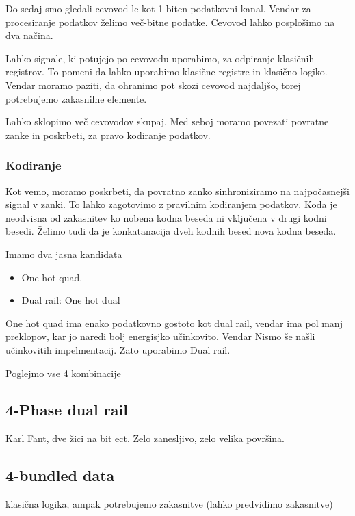 Do sedaj smo gledali cevovod le kot 1 biten podatkovni kanal. Vendar za procesiranje podatkov želimo več-bitne podatke. Cevovod lahko posplošimo na dva načina. 

Lahko signale, ki potujejo po cevovodu uporabimo, za odpiranje klasičnih registrov. To pomeni da lahko uporabimo klasične registre in klasično logiko. Vendar moramo paziti, da ohranimo pot skozi cevovod najdaljšo, torej potrebujemo zakasnilne elemente.

Lahko sklopimo več cevovodov skupaj. Med seboj moramo povezati povratne zanke in poskrbeti, za pravo kodiranje podatkov.

\subsubsection{Kodiranje} \label{b}
Kot vemo, moramo poskrbeti, da povratno zanko sinhroniziramo na najpočasnejši signal v zanki. To lahko zagotovimo z pravilnim kodiranjem podatkov. Koda je neodvisna od zakasnitev ko nobena kodna beseda ni vključena v drugi kodni besedi. Želimo tudi da je konkatanacija dveh kodnih besed nova kodna beseda.

Imamo dva jasna kandidata

\begin{itemize}
	\item One hot quad.
	\item Dual rail: One hot dual
\end{itemize}

One hot quad ima enako podatkovno gostoto kot dual rail, vendar ima pol manj preklopov, kar jo naredi bolj energisjko učinkovito. Vendar Nismo še našli učinkovitih impelmentacij. Zato uporabimo Dual rail.

%
%

Poglejmo vse 4 kombinacije

\subsection{4-Phase dual rail} \label{b}
Karl Fant, dve žici na bit ect. Zelo zanesljivo, zelo velika površina.

\subsection{4-bundled data} \label{b}
klasična logika, ampak potrebujemo zakasnitve (lahko predvidimo zakasnitve)

